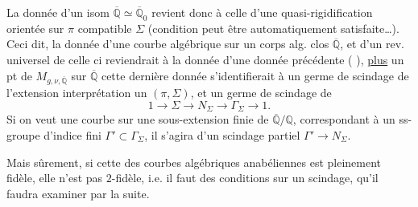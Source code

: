La donnée d'un isom $\overline{\mathbb Q}\simeq\overline{\mathbb Q}_0$ revient donc à celle d'une quasi-rigidification orientée sur $\pi$ compatible  $\Sigma$ (condition peut être automatiquement satisfaite\ldots).
Ceci dit, la donnée d'une courbe algébrique  sur   un corps alg. clos $\overline{\mathbb Q}$, et d'un rev. universel  de celle ci reviendrait à la donnée d'une donnée précédente ( ), \uline{plus} un pt de $M_{g,\nu,\overline{\mathbb Q}}$ sur $\overline{\mathbb Q}$   cette dernière donnée s'identifierait à un  germe de scindage de l'extension
interprétation     un $(\pi,\Sigma)$, et un germe de scindage de
\[
1\longrightarrow\Sigma\longrightarrow N_\Sigma\longrightarrow\Gamma_\Sigma\longrightarrow1.
\]
Si on veut une courbe sur une sous-extension finie  de $\overline{\mathbb Q}/\mathbb Q$, correspondant à un ss-groupe d'indice fini $\Gamma'\subset\Gamma_\Sigma$, il s'agira d'un scindage  partiel $\Gamma'\longrightarrow N_\Sigma$.


Mais sûrement, si cette   des courbes algébriques anabéliennes est pleinement fidèle, elle n'est pas $2$-fidèle, i.e. il faut des conditions sur un scindage, qu'il faudra examiner par la suite.

